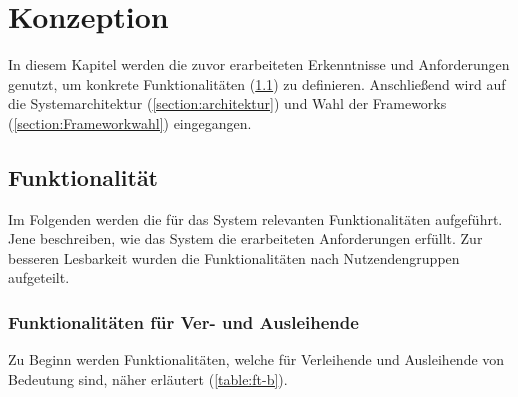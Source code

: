 \chapter{Konzeption}
\label{chapter-konzept}

In diesem Kapitel werden die zuvor erarbeiteten Erkenntnisse und Anforderungen genutzt, um konkrete
Funktionalitäten (\ref{section:funktionalitaeten}) zu definieren. Anschließend wird auf die
Systemarchitektur (\ref{section:architektur}) und Wahl der Frameworks (\ref{section:Frameworkwahl})
eingegangen.
\section{Funktionalität}
\label{section:funktionalitaeten}
Im Folgenden werden die für das System relevanten Funktionalitäten aufgeführt.
Jene beschreiben, wie das System die erarbeiteten Anforderungen erfüllt. Zur
besseren Lesbarkeit wurden die Funktionalitäten nach Nutzendengruppen aufgeteilt.

\subsection{Funktionalitäten für Ver- und Ausleihende}
Zu Beginn werden Funktionalitäten, welche für Verleihende und Ausleihende von
Bedeutung sind, näher erläutert (\ref{table:ft-b}).

